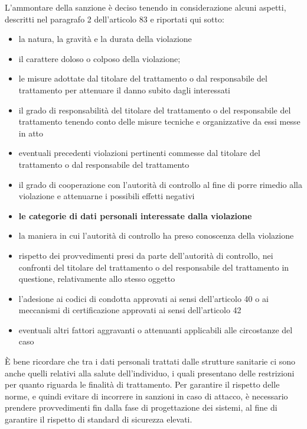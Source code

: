 \documentclass[12pt]{article}
\begin{document}
L'ammontare della sanzione è deciso tenendo in considerazione alcuni aspetti, descritti nel paragrafo 2 dell'articolo 83 e riportati qui sotto:

\begin{itemize}
    \item la natura, la gravità e la durata della violazione
    \item il carattere doloso o colposo della violazione;
    \item le misure adottate dal titolare del trattamento o dal responsabile del trattamento per attenuare il danno subito dagli interessati
    \item il grado di responsabilità del titolare del trattamento o del responsabile del trattamento tenendo conto delle misure tecniche e organizzative da essi messe in atto
    \item eventuali precedenti violazioni pertinenti commesse dal titolare del trattamento o dal responsabile del trattamento
    \item il grado di cooperazione con l'autorità di controllo al fine di porre rimedio alla violazione e attenuarne i possibili effetti negativi
    \item \textbf{le categorie di dati personali interessate dalla violazione}
    \item la maniera in cui l'autorità di controllo ha preso conoscenza della violazione
    \item rispetto dei provvedimenti presi da parte dell'autorità di controllo, nei confronti del titolare del trattamento o del responsabile del trattamento in questione, relativamente allo stesso oggetto
    \item l'adesione ai codici di condotta approvati ai sensi dell'articolo 40 o ai meccanismi di certificazione approvati ai sensi dell'articolo 42
    \item eventuali altri fattori aggravanti o attenuanti applicabili alle circostanze del caso
\end{itemize}

È bene ricordare che tra i dati personali trattati dalle strutture sanitarie ci sono anche quelli relativi alla salute dell'individuo, i quali presentano delle restrizioni per quanto riguarda le finalità di trattamento. Per garantire il rispetto delle norme, e quindi evitare di incorrere in sanzioni in caso di attacco, è necessario prendere provvedimenti fin dalla fase di progettazione dei sistemi, al fine di garantire il rispetto di standard di sicurezza elevati.
\end{document}
